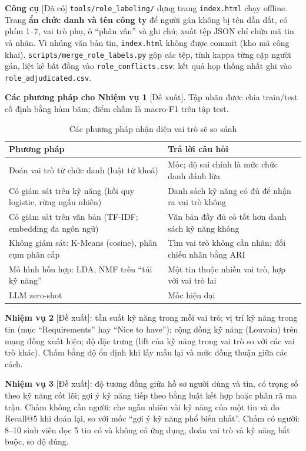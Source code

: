 \documentclass[12pt]{article}
\newcommand{\code}[1]{\texttt{#1}}
\newcommand{\dacoi}{\textsf{[Đã có]}}
\newcommand{\dexuat}{\textsf{[Đề xuất]}}
\begin{document}
\textbf{Công cụ} \dacoi{} \code{tools/role\_labeling/} dựng trang \code{index.html} chạy offline. Trang \textbf{ẩn chức danh và tên công ty} để người gán không bị tên dẫn dắt, có phím 1--7, vai trò phụ, ô ``phân vân'' và ghi chú; xuất tệp JSON chỉ chứa mã tin và nhãn. Vì nhúng văn bản tin, \code{index.html} không được commit (kho mã công khai). \code{scripts/merge\_role\_labels.py} gộp các tệp, tính kappa từng cặp người gán, liệt kê bất đồng vào \code{role\_conflicts.csv}; kết quả họp thống nhất ghi vào \code{role\_adjudicated.csv}.

\textbf{Các phương pháp cho Nhiệm vụ 1} \dexuat{}. Tập nhãn được chia train/test cố định bằng hàm băm; điểm chấm là macro-F1 trên tập test.
\begin{table}[htbp]
\centering
\caption{Các phương pháp nhận diện vai trò sẽ so sánh}
\label{tab:methods}
\renewcommand{\arraystretch}{1.15}
\begin{tabularx}{\textwidth}{>{\raggedright\arraybackslash}p{5.2cm} X}
\toprule
\textbf{Phương pháp} & \textbf{Trả lời câu hỏi} \\
\midrule
Đoán vai trò từ chức danh (luật từ khoá) & Mốc; độ sai chính là mức chức danh đánh lừa \\
Có giám sát trên kỹ năng (hồi quy logistic, rừng ngẫu nhiên) & Danh sách kỹ năng có đủ để nhận ra vai trò không \\
Có giám sát trên văn bản (TF-IDF; embedding đa ngôn ngữ) & Văn bản đầy đủ có tốt hơn danh sách kỹ năng không \\
Không giám sát: K-Means (cosine), phân cụm phân cấp & Tìm vai trò không cần nhãn; đối chiếu nhãn bằng ARI \\
Mô hình hỗn hợp: LDA, NMF trên ``túi kỹ năng'' & Một tin thuộc nhiều vai trò, hợp với vai trò lai \\
LLM zero-shot & Mốc hiện đại \\
\bottomrule
\end{tabularx}
\end{table}

\textbf{Nhiệm vụ 2} \dexuat{}: tần suất kỹ năng trong mỗi vai trò; vị trí kỹ năng trong tin (mục ``Requirements'' hay ``Nice to have''); cộng đồng kỹ năng (Louvain) trên mạng đồng xuất hiện; độ đặc trưng (lift của kỹ năng trong vai trò so với các vai trò khác). Chấm bằng độ ổn định khi lấy mẫu lại và mức đồng thuận giữa các cách.

\textbf{Nhiệm vụ 3} \dexuat{}: độ tương đồng giữa hồ sơ người dùng và tin, có trọng số theo kỹ năng cốt lõi; gợi ý kỹ năng tiếp theo bằng luật kết hợp hoặc phân rã ma trận. Chấm không cần người: che ngẫu nhiên vài kỹ năng của một tin và đo Recall@5 khi đoán lại, so với mốc ``gợi ý kỹ năng phổ biến nhất''. Chấm có người: 8--10 sinh viên đọc 5 tin có và không có ứng dụng, đoán vai trò và kỹ năng bắt buộc, so độ đúng.
\end{document}
